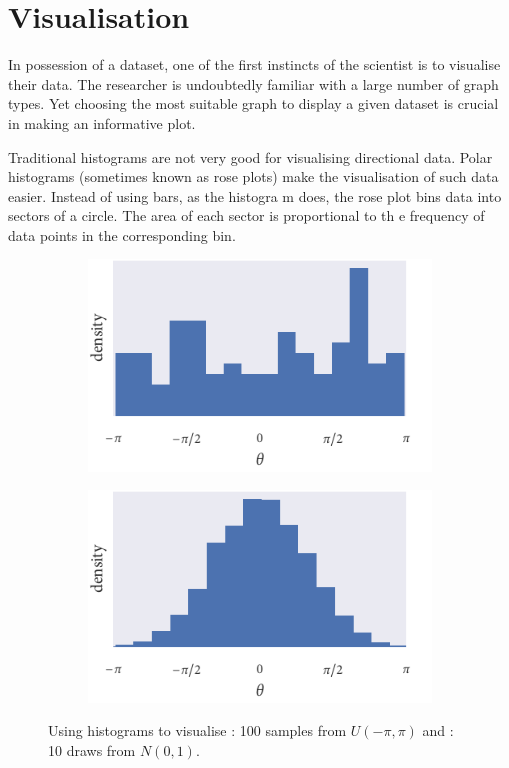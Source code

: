 \section{Visualisation}
\label{sec:circular_visualisation}

In possession of a dataset, one of the first instincts of the scientist is to visualise their data. The
 researcher is undoubtedly familiar with a large number of graph types. Yet choosing the most suitable 
graph to display a given dataset is crucial in making an informative plot.

Traditional histograms are not very good for visualising directional data. Polar histograms (sometimes 
known as rose plots) make the visualisation of such data easier. Instead of using bars, as the histogra
m does, the rose plot bins data into sectors of a circle. The area of each sector is proportional to th
e frequency of data points in the corresponding bin.

\begin{figure}
	\begin{subfigure}[b]{0.48\textwidth}
		\includegraphics{unif_angle_hist.pdf}
		\caption{}
		\label{subfig:unif_angle_hist}
	\end{subfigure}%
	\hspace{0.01\textwidth}
	\begin{subfigure}[b]{0.48\textwidth}
		\includegraphics{norm_angle_hist.pdf}
		\caption{}
		\label{subfig:norm_angle_hist}
	\end{subfigure}
	\caption{Using histograms to visualise : 100 samples from $U(-\pi, \pi)
$ and : 10 draws from $N(0, 1)$.}
	\label{fig:angle_hist}
\end{figure}


